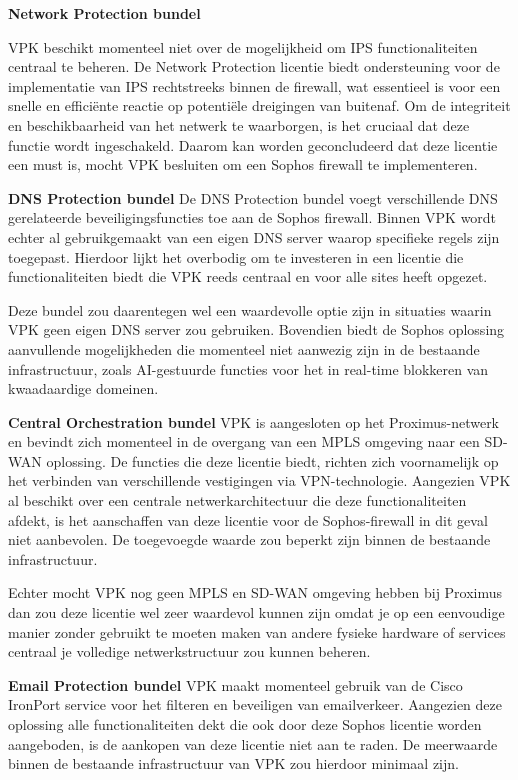 \textbf{Network Protection bundel}

VPK beschikt momenteel niet over de mogelijkheid om IPS functionaliteiten centraal te beheren. De Network Protection licentie biedt ondersteuning voor de implementatie van IPS rechtstreeks binnen de firewall, wat essentieel is voor een snelle en efficiënte reactie op potentiële dreigingen van buitenaf. Om de integriteit en beschikbaarheid van het netwerk te waarborgen, is het cruciaal dat deze functie wordt ingeschakeld. Daarom kan worden geconcludeerd dat deze licentie een must is, mocht VPK besluiten om een Sophos firewall te implementeren.


\textbf{DNS Protection bundel}
De DNS Protection bundel voegt verschillende DNS gerelateerde beveiligingsfuncties toe aan de Sophos firewall. Binnen VPK wordt echter al gebruikgemaakt van een eigen DNS server waarop specifieke regels zijn toegepast. Hierdoor lijkt het overbodig om te investeren in een licentie die functionaliteiten biedt die VPK reeds centraal en voor alle sites heeft opgezet. 

\vspace{5mm}
Deze bundel zou daarentegen wel een waardevolle optie zijn in situaties waarin VPK geen eigen DNS server zou gebruiken. Bovendien biedt de Sophos oplossing aanvullende mogelijkheden die momenteel niet aanwezig zijn in de bestaande infrastructuur, zoals AI-gestuurde functies voor het in real-time blokkeren van kwaadaardige domeinen.


\textbf{Central Orchestration bundel}
VPK is aangesloten op het Proximus-netwerk en bevindt zich momenteel in de overgang van een MPLS omgeving naar een SD-WAN oplossing. De functies die deze licentie biedt, richten zich voornamelijk op het verbinden van verschillende vestigingen via VPN-technologie. Aangezien VPK al beschikt over een centrale netwerkarchitectuur die deze functionaliteiten afdekt, is het aanschaffen van deze licentie voor de Sophos-firewall in dit geval niet aanbevolen. De toegevoegde waarde zou beperkt zijn binnen de bestaande infrastructuur. 

\vspace{5mm}
Echter mocht VPK nog geen MPLS en SD-WAN omgeving hebben bij Proximus dan zou deze licentie wel zeer waardevol kunnen zijn omdat je op een eenvoudige manier zonder gebruikt te moeten maken van andere fysieke hardware of services centraal je volledige netwerkstructuur zou kunnen beheren.


\textbf{Email Protection bundel}
VPK maakt momenteel gebruik van de Cisco IronPort service voor het filteren en beveiligen van emailverkeer. Aangezien deze oplossing alle functionaliteiten dekt die ook door deze Sophos licentie worden aangeboden, is de aankopen van deze licentie niet aan te raden. De meerwaarde binnen de bestaande infrastructuur van VPK zou hierdoor minimaal zijn.


